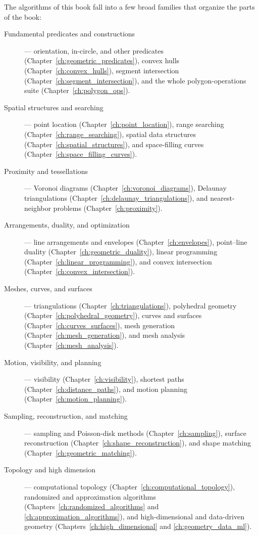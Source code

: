 The algorithms of this book fall into a few broad families that organize the
parts of the book:

\begin{description}
  \item[Fundamental predicates and constructions] --- orientation,
    in-circle, and other predicates (Chapter~\ref{ch:geometric_predicates}),
    convex hulls (Chapter~\ref{ch:convex_hulls}), segment intersection
    (Chapter~\ref{ch:segment_intersection}), and the whole
    polygon-operations suite (Chapter~\ref{ch:polygon_ops}).
  \item[Spatial structures and searching] --- point location
    (Chapter~\ref{ch:point_location}), range searching
    (Chapter~\ref{ch:range_searching}), spatial data structures
    (Chapter~\ref{ch:spatial_structures}), and space-filling curves
    (Chapter~\ref{ch:space_filling_curves}).
  \item[Proximity and tessellations] --- Voronoi diagrams
    (Chapter~\ref{ch:voronoi_diagrams}), Delaunay triangulations
    (Chapter~\ref{ch:delaunay_triangulations}), and nearest-neighbor
    problems (Chapter~\ref{ch:proximity}).
  \item[Arrangements, duality, and optimization] --- line arrangements and
    envelopes (Chapter~\ref{ch:envelopes}), point--line duality
    (Chapter~\ref{ch:geometric_duality}), linear programming
    (Chapter~\ref{ch:linear_programming}), and convex intersection
    (Chapter~\ref{ch:convex_intersection}).
  \item[Meshes, curves, and surfaces] --- triangulations
    (Chapter~\ref{ch:triangulations}), polyhedral geometry
    (Chapter~\ref{ch:polyhedral_geometry}), curves and surfaces
    (Chapter~\ref{ch:curves_surfaces}), mesh generation
    (Chapter~\ref{ch:mesh_generation}), and mesh analysis
    (Chapter~\ref{ch:mesh_analysis}).
  \item[Motion, visibility, and planning] --- visibility
    (Chapter~\ref{ch:visibility}), shortest paths
    (Chapter~\ref{ch:distance_paths}), and motion planning
    (Chapter~\ref{ch:motion_planning}).
  \item[Sampling, reconstruction, and matching] --- sampling and Poisson-disk
    methods (Chapter~\ref{ch:sampling}), surface reconstruction
    (Chapter~\ref{ch:shape_reconstruction}), and shape matching
    (Chapter~\ref{ch:geometric_matching}).
  \item[Topology and high dimension] --- computational topology
    (Chapter~\ref{ch:computational_topology}), randomized and approximation
    algorithms (Chapters~\ref{ch:randomized_algorithms} and
    \ref{ch:approximation_algorithms}), and high-dimensional and
    data-driven geometry (Chapters~\ref{ch:high_dimensional} and
    \ref{ch:geometry_data_ml}).
\end{description}

